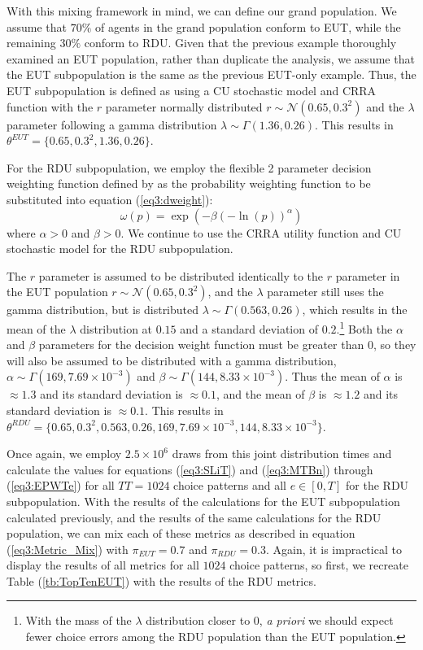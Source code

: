 \documentclass[../main.tex]{subfiles}
\begin{document}
With this mixing framework in mind, we can define our grand population.
We assume that $70\%$ of agents in the grand population conform to EUT, while the remaining $30\%$ conform to RDU.
Given that the previous example thoroughly examined an EUT population, rather than duplicate the analysis, we assume that the EUT subpopulation is the same as the previous EUT-only example.
Thus, the EUT subpopulation is defined as using a CU stochastic model and CRRA function with the $r$ parameter normally distributed $r \sim \mathcal{N}(0.65 , 0.3^2 )$ and the $\lambda$ parameter following a gamma distribution $\lambda \sim \Gamma(1.36 , 0.26)$.
This results in $\theta^{EUT} = \lbrace 0.65 ,0.3^2, 1.36 , 0.26\rbrace$.

For the RDU subpopulation, we employ the flexible 2 parameter decision weighting function defined by \textcite{Prelec1998} as the probability weighting function to be substituted into equation (\ref{eq3:dweight}):
\begin{equation}
	\label{eq3:pw:pre}
	\omega(p)=\exp(-\beta(-\ln(p))^\alpha)
\end{equation}
\noindent where $\alpha > 0$ and $\beta > 0$.
We continue to use the CRRA utility function and CU stochastic model for the RDU subpopulation.

The $r$ parameter is assumed to be distributed identically to the $r$ parameter in the EUT population $r \sim \mathcal{N}(0.65 , 0.3^2 )$, and the $\lambda$ parameter still uses the gamma distribution, but is distributed $\lambda \sim \Gamma(0.563 , 0.26)$, which results in the mean of the $\lambda$ distribution at $0.15$ and a standard deviation of $0.2$.\footnote{
	With the mass of the $\lambda$ distribution closer to $0$, \textit{a priori} we should expect fewer choice errors among the RDU population than the EUT population.
}
Both the $\alpha$ and $\beta$ parameters for the decision weight function must be greater than $0$, so they will also be assumed to be distributed with a gamma distribution, $\alpha \sim \Gamma(169 , 7.69 \times 10^{-3})$ and $\beta \sim \Gamma(144 , 8.33 \times 10^{-3})$.
Thus the mean of $\alpha$ is $\approx 1.3$ and its standard deviation is $\approx 0.1$, and the mean of $\beta$ is $\approx 1.2$ and its standard deviation is $\approx 0.1$.
This results in $\theta^{RDU} = \lbrace  0.65 ,0.3^2,  0.563 , 0.26 , 169 , 7.69 \times 10^{-3} , 144 , 8.33 \times 10^{-3} \rbrace$.

Once again, we employ $2.5 \times 10^6$ draws from this joint distribution times and calculate the values for equations (\ref{eq3:SLiT}) and (\ref{eq3:MTBn}) through (\ref{eq3:EPWTe}) for all $\mathit{TT} =1024$ choice patterns and all $e \in[0,T]$ for the RDU subpopulation.
With the results of the calculations for the EUT subpopulation calculated previously, and the results of the same calculations for the RDU population, we can mix each of these metrics as described in equation (\ref{eq3:Metric_Mix}) with $\pi_{EUT} = 0.7$ and $\pi_{RDU} = 0.3$.
Again, it is impractical to display the results of all metrics for all $1024$ choice patterns, so first, we recreate Table (\ref{tb:TopTenEUT}) with the results of the RDU metrics.
\end{document}
